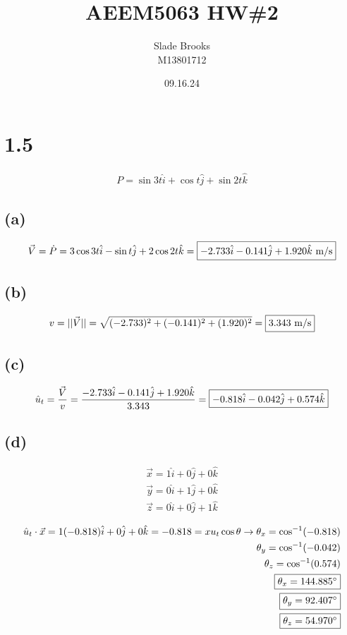 \documentclass[12 pt]{article}
\title{AEEM5063 HW\#2}
\date{09.16.24}
\author{Slade Brooks \\ M13801712}
\begin{document}
\maketitle

\section*{1.5}
\begin{align*}
    P=\sin{3t}\hat{i} + \cos{t}\hat{j} + \sin{2t}\hat{k}
\end{align*}
\subsection*{(a)}
\begin{align*}
    \vec{V}=\dot{P}=3\cos{3t}\hat{i} - \sin{t}\hat{j} + 2\cos{2t}\hat{k}=\fbox{$-2.733\hat{i} - 0.141\hat{j} + 1.920\hat{k}$ m/s}
\end{align*}

\subsection*{(b)}
\begin{align*}
    v=||\vec{V}||=\sqrt{(-2.733)^2 + (-0.141)^2 + (1.920)^2}=\fbox{$3.343$ m/s}
\end{align*}

\subsection*{(c)}
\begin{align*}
    \hat{u}_t=\frac{\vec{V}}{v}=\frac{-2.733\hat{i} - 0.141\hat{j} + 1.920\hat{k}}{3.343}=\fbox{$-0.818\hat{i} - 0.042\hat{j} 
    + 0.574\hat{k}$}
\end{align*}

\subsection*{(d)}
\begin{align*}
    \vec{x}=1\hat{i} + 0\hat{j} + 0\hat{k} \\
    \vec{y}=0\hat{i} + 1\hat{j} + 0\hat{k} \\
    \vec{z}=0\hat{i} + 0\hat{j} + 1\hat{k} \\
\end{align*}
\begin{align*}
    \hat{u}_t \cdot \vec{x} = 1(-0.818)\hat{i} + 0\hat{j} + 0\hat{k} = -0.818 = xu_t\cos{\theta} \rightarrow \theta_x=\cos^{-1}(-0.818) \\
    \theta_y=\cos^{-1}(-0.042) \\
    \theta_z=\cos^{-1}(0.574) \\
    \fbox{$\theta_x=144.885^\circ$} \\
    \fbox{$\theta_y=92.407^\circ$} \\
    \fbox{$\theta_z=54.970^\circ$}
\end{align*}
\end{document}
